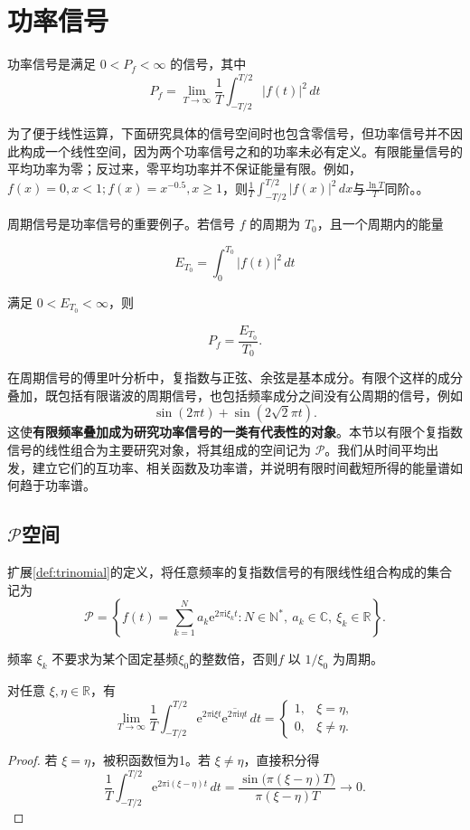 \section{功率信号}\label{sec:Power_Signal}

功率信号是满足 $0<P_f<\infty$ 的信号，其中
$$
    P_f=\lim_{T\to\infty}\frac1T\int_{-T/2}^{T/2}|f(t)|^2\,dt
$$

为了便于线性运算，下面研究具体的信号空间时也包含零信号，但功率信号并不因此构成一个线性空间，因为两个功率信号之和的功率未必有定义。有限能量信号的平均功率为零；反过来，零平均功率并不保证能量有限。例如，$f(x)=0,x<1;f(x)=x^{-0.5},x\ge 1$，则$\frac{1}{T}\int_{-T/2}^{T/2}| f(x)|^2  \,dx$与$\frac{\ln T}{T}$同阶。。

周期信号是功率信号的重要例子。若信号 $f$ 的周期为 $T_0$，且一个周期内的能量

$$
    E_{T_0}=\int_0^{T_0}|f(t)|^2\,dt
$$

满足 $0<E_{T_0}<\infty$，则

$$
    P_f=\frac{E_{T_0}}{T_0}.
$$

在周期信号的傅里叶分析中，复指数与正弦、余弦是基本成分。有限个这样的成分叠加，既包括有限谐波的周期信号，也包括频率成分之间没有公周期的信号，例如
$$
    \sin(2\pi t)+\sin(2\sqrt2\pi t).
$$
这使\textbf{有限频率叠加成为研究功率信号的一类有代表性的对象}。本节以有限个复指数信号的线性组合为主要研究对象，将其组成的空间记为 $\mathcal{P}$。我们从时间平均出发，建立它们的互功率、相关函数及功率谱，并说明有限时间截短所得的能量谱如何趋于功率谱。

\subsection{\texorpdfstring{$\mathcal{P}$空间}{P空间}}\label{sub:power_signal}

\begin{definition}
    扩展\cref{def:trinomial}的定义，将任意频率的复指数信号的有限线性组合构成的集合记为
    $$
        \mathcal{P}=\left\{
        f(t)=\sum_{k=1}^{N}a_k\mathrm e^{2\pi\mathrm i\xi_k t}:
        N\in\mathbb N^*,\ a_k\in\mathbb C,\ \xi_k\in\mathbb R
        \right\}.
    $$
\end{definition}

频率 $\xi_k$ 不要求为某个固定基频$\xi_0$的整数倍，否则$f$ 以 $1/\xi_0$ 为周期。

\begin{proposition}[平均正交性]
    对任意 $\xi,\eta\in\mathbb R$，有
    $$
        \lim_{T\to\infty}\frac1T\int_{-T/2}^{T/2}
        \mathrm e^{2\pi\mathrm i\xi t}
        \overline{\mathrm e^{2\pi\mathrm i\eta t}}\,dt
        =\begin{cases}
            1, & \xi=\eta,   \\
            0, & \xi\ne\eta.
        \end{cases}
    $$
\end{proposition}
\begin{proof}
    若 $\xi=\eta$，被积函数恒为1。若 $\xi\ne\eta$，直接积分得
    $$
        \frac1T\int_{-T/2}^{T/2}\mathrm e^{2\pi\mathrm i(\xi-\eta)t}\,dt
        =\frac{\sin\bigl(\pi(\xi-\eta)T\bigr)}
        {\pi(\xi-\eta)T}\longrightarrow0.
    $$
\end{proof}

